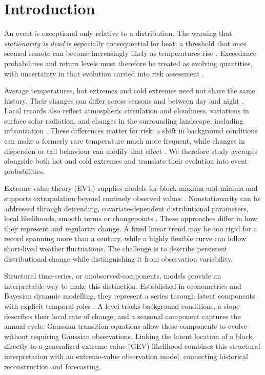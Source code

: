 \documentclass[11pt,a4paper]{article}
\begin{document}
	\section{Introduction}\label{sec:intro}
	
	An event is exceptional only relative to a distribution. The warning that \emph{stationarity is dead} \citep{milly2008} is especially consequential for heat: a threshold that once seemed remote can become increasingly likely as temperatures rise \citep{fischer2021}. Exceedance probabilities and return levels must therefore be treated as evolving quantities, with uncertainty in that evolution carried into risk assessment \citep{cooley2012,slater2020}.
	
	Average temperatures, hot extremes and cold extremes need not share the same history. Their changes can differ across seasons and between day and night \citep{donat2012,franzke2015,mckinnon2016,dunn2019}. Local records also reflect atmospheric circulation and cloudiness, variations in surface solar radiation, and changes in the surrounding landscape, including urbanization \citep{ipcc2021,wild2009,hamdi2009,hamdi2011}. These differences matter for risk: a shift in background conditions can make a formerly rare temperature much more frequent, while changes in dispersion or tail behaviour can modify that effect \citep{huybers2014}. We therefore study averages alongside both hot and cold extremes and translate their evolution into event probabilities.
	
	Extreme-value theory (EVT) supplies models for block maxima and minima and supports extrapolation beyond routinely observed values \citep{fisher1928,coles2001}. Nonstationarity can be addressed through detrending, covariate-dependent distributional parameters, local likelihoods, smooth terms or changepoints \citep{mentaschi2016,katz2013,robin2020,davison2000,beaulieu2012,youngman2022}. These approaches differ in how they represent and regularize change. A fixed linear trend may be too rigid for a record spanning more than a century, while a highly flexible curve can follow short-lived weather fluctuations. The challenge is to describe persistent distributional change while distinguishing it from observation variability.
	
	Structural time-series, or unobserved-components, models provide an interpretable way to make this distinction. Established in econometrics and Bayesian dynamic modelling, they represent a series through latent components with explicit temporal roles \citep{harvey1990,west2006,durbin2012}. A level tracks background conditions, a slope describes their local rate of change, and a seasonal component captures the annual cycle. Gaussian transition equations allow these components to evolve without requiring Gaussian observations. Linking the latent location of a block directly to a generalized extreme value (GEV) likelihood combines this structural interpretation with an extreme-value observation model, connecting historical reconstruction and forecasting.
	
\end{document}
